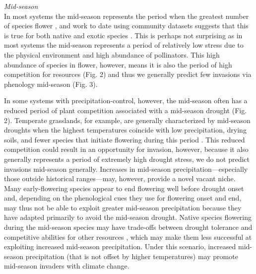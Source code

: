 \documentclass[11pt,a4paper,oneside]{article}
\begin{document}
\noindent \emph{Mid-season}\\
\noindent In most systems the mid-season represents the period when the greatest number of species flower \citep[e.g.,][]{Fitter:2002sm,Aldridge:2011}, and work to date using community datasets suggests that this is true for both native and exotic species \citep{wolkovichAmBot2013}. This is perhaps not surprising as in most systems the mid-season represents a period of relatively low stress due to the physical environment and high abundance of pollinators. This high abundance of species in flower, however, means it is also the period of high competition for resources (Fig. 2) and thus we generally predict few invasions via phenology mid-season (Fig. 3). 

In some systems with precipitation-control, however, the mid-season often has a reduced period of plant competition associated with a mid-season drought (Fig. 2). Temperate grasslands, for example, are generally characterized by mid-season droughts when the highest temperatures coincide with low precipitation, drying soils, and fewer species that initiate flowering during this period \citep[e.g.,][]{Craine:2012kl}. This reduced competition could result in an opportunity for invasion, however, because it also generally represents a period of extremely high drought stress, we do not predict invasions mid-season generally. Increases in mid-season precipitation---especially those outside historical ranges---may, however, provide a novel vacant niche. Many early-flowering species appear to end flowering well before drought onset and, depending on the phenological cues they use for flowering onset and end, may thus not be able to exploit greater mid-season precipitation because they have adapted primarily to avoid the mid-season drought. Native species flowering during the mid-season species may have trade-offs between drought tolerance and competitive abilities for other resources \citep{Craine2013}, which may make them less successful at exploiting increased mid-season precipitation. Under this  scenario, increased mid-season precipitation (that is not offset by higher temperatures) may promote mid-season invaders with climate change.\\
\end{document}

